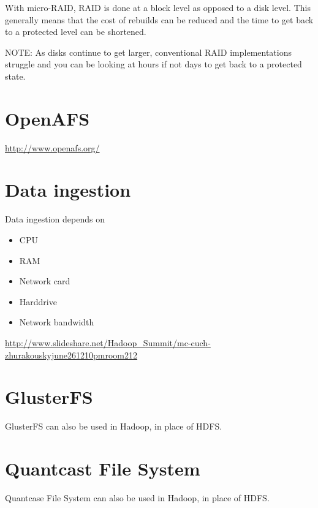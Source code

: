 With micro-RAID,  RAID is done at a block level as opposed to a disk level. 
This generally means that the cost of rebuilds can be reduced and the time to
get back to a protected level can be shortened. 

NOTE: As disks continue to get larger, conventional RAID implementations
struggle and you can be looking at hours if not days to get back to a protected
state.







\section{OpenAFS}
\label{sec:OpenAFS}

\url{http://www.openafs.org/}

\section{Data ingestion}
\label{sec:data_ingestion}

Data ingestion depends on
\begin{itemize}
  \item CPU 
  \item RAM
  \item Network card
  \item Harddrive
  \item Network bandwidth
\end{itemize}
\url{http://www.slideshare.net/Hadoop_Summit/mc-cuch-zhurakouskyjune261210pmroom212}

\section{GlusterFS}

GlusterFS can also be used in Hadoop, in place of HDFS.

\section{Quantcast File System}

Quantcase File System can also be used in Hadoop, in place of HDFS.